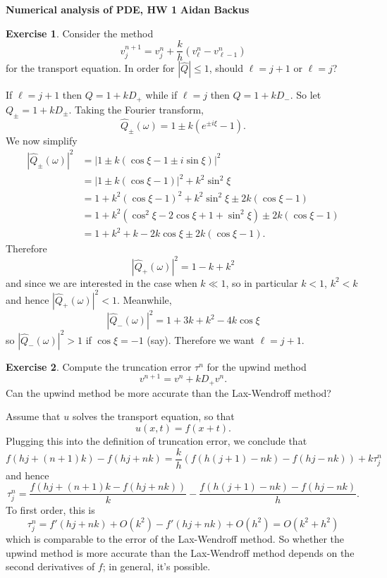 \documentclass[10pt]{article}
\theoremstyle{definition}
\newtheorem{exer}{Exercise}
\begin{document}
\noindent
\large\textbf{Numerical analysis of PDE, HW 1} \hfill \textbf{Aidan Backus} \\

\begin{exer}
Consider the method
$$v_j^{n+1} = v_j^n + \frac{k}{h}(v^n_\ell - v^n_{\ell - 1})$$
for the transport equation. In order for $|\hat Q| \leq 1$, should $\ell = j + 1$ or $\ell = j$?
\end{exer}

If $\ell = j + 1$ then $Q = 1 + kD_+$ while if $\ell = j$ then $Q = 1 + kD_-$. So let $Q_\pm = 1 + kD_\pm$.
Taking the Fourier transform,
$$\hat Q_\pm(\omega) = 1 \pm k(e^{\pm i\xi} - 1).$$
We now simplify
\begin{align*}
|\hat Q_\pm(\omega)|^2 &= |1 \pm k(\cos \xi - 1 \pm i\sin \xi)|^2 \\
&= |1 \pm k (\cos \xi - 1)|^2 + k^2 \sin^2 \xi\\
&= 1 + k^2(\cos \xi - 1)^2 + k^2 \sin^2 \xi \pm 2k (\cos \xi - 1)\\
&= 1 + k^2(\cos^2 \xi - 2\cos \xi + 1 + \sin^2 \xi) \pm 2k(\cos \xi - 1)\\
&= 1 + k^2 + k - 2k \cos \xi \pm 2k(\cos \xi - 1).
\end{align*}
Therefore
$$|\hat Q_+(\omega)|^2 = 1 - k + k^2$$
and since we are interested in the case when $k \ll 1$, so in particular $k < 1$, $k^2 < k$ and hence $|\hat Q_+(\omega)|^2 < 1$.
Meanwhile,
$$|\hat Q_-(\omega)|^2 = 1 + 3k + k^2 - 4k \cos \xi$$
so $|\hat Q_-(\omega)|^2 > 1$ if $\cos \xi = -1$ (say).
Therefore we want $\ell = j + 1$.


\begin{exer}
Compute the truncation error $\tau^n$ for the upwind method
$$v^{n + 1} = v^n + kD_+v^n.$$
Can the upwind method be more accurate than the Lax-Wendroff method?
\end{exer}

Assume that $u$ solves the transport equation, so that
$$u(x, t) = f(x + t).$$
Plugging this into the definition of truncation error, we conclude that
$$f(hj + (n + 1)k) - f(hj + nk) = \frac{k}{h}(f(h(j+1) - nk) - f(hj - nk)) + k\tau^n_j$$
and hence
$$\tau^n_j = \frac{f(hj + (n + 1)k - f(hj + nk))}{k} - \frac{f(h(j + 1) - nk) - f(hj - nk)}{h}.$$
To first order, this is
$$\tau^n_j = f'(hj + nk) + O(k^2) - f'(hj + nk) + O(h^2) = O(k^2 + h^2)$$
which is comparable to the error of the Lax-Wendroff method.
So whether the upwind method is more accurate than the Lax-Wendroff method depends on the second derivatives of $f$; in general, it's possible.
\end{document}

